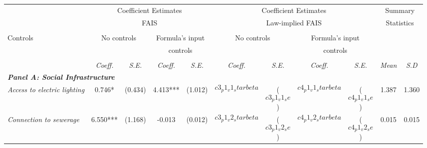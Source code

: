 

\begin{tabular}{lcccccccccc}

\toprule

\multicolumn{1}{l}{} & \multicolumn{4}{c}{Coefficient Estimates} & \multicolumn{4}{c}{Coefficient Estimates} & \multicolumn{2}{c}{Summary} \\
\multicolumn{1}{l}{} & \multicolumn{4}{c}{FAIS} & \multicolumn{4}{c}{Law-implied FAIS} & \multicolumn{2}{c}{ Statistics} \\

\cmidrule(l{1mm}r{1mm}){2-5} \cmidrule(l{1mm}r{1mm}){6-9} \cmidrule(l{1mm}r{1mm}){10-11}  \\


\multicolumn{1}{l}{Controls} & \multicolumn{2}{c}{No controls} & \multicolumn{2}{c}{Formula's input } & \multicolumn{2}{c}{No controls} & \multicolumn{2}{c}{Formula's input } & \multicolumn{2}{c}{} \\
\multicolumn{1}{l}{} & \multicolumn{2}{c}{} & \multicolumn{2}{c}{controls} & \multicolumn{2}{c}{} & \multicolumn{2}{c}{controls} & \multicolumn{2}{c}{} \\


\cmidrule(l{1mm}r{1mm}){2-3} \cmidrule(l{1mm}r{1mm}){4-5} \cmidrule(l{1mm}r{1mm}){6-7} \cmidrule(l{1mm}r{1mm}){8-9} \cmidrule(l{1mm}r{1mm}){10-11}  \\

\multicolumn{1}{l}{} & \multicolumn{1}{c}{\textit{Coeff.}} & \multicolumn{1}{c}{\textit{S.E.}} 
					 & \multicolumn{1}{c}{\textit{Coeff.}} & \multicolumn{1}{c}{\textit{S.E.}}
					 & \multicolumn{1}{c}{\textit{Coeff.}} & \multicolumn{1}{c}{\textit{S.E.}}
					 & \multicolumn{1}{c}{\textit{Coeff.}} & \multicolumn{1}{c}{\textit{S.E.}}
					 & \multicolumn{1}{c}{\textit{Mean}} & \multicolumn{1}{c}{\textit{S.D}} \\ 
 
\midrule

\multicolumn{9}{l}{\textit{\bf Panel  A: Social Infrastructure}}   \\  

\textit{Access to electric lighting}  &  0.746*  
					   & (0.434) 
					   &  4.413***  
					   & (1.012) 
					   &  $$c3_p1_v1_starbeta$$  
					   & ($$c3_p1_v1_se$$) 
					   &  $$c4_p1_v1_starbeta$$  
					   & ($$c4_p1_v1_se$$) 
					   &  1.387  
					   &  1.360 \\[0.2cm]
					   
\textit{Connection to sewerage}  &  6.550***  
					   & (1.168) 
					   &  -0.013  
					   & (0.012)
					   &  $$c3_p1_v2_starbeta$$  
					   & ($$c3_p1_v2_se$$) 
					   &  $$c4_p1_v2_starbeta$$  
					   & ($$c4_p1_v2_se$$) 
					   &  0.015  
					   &  0.015 \\[0.2cm]
					   

\end{tabular}
